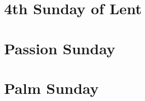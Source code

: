{{\bigskip
\benedicamusdomino{}
}

\def\commemorations{If today is March 18 or 19, the First Vespers of St Joseph is commemorated as on page \pageref{stjoseph-commem}.  If today is March 25 or 26, the First Vespers of the Annunciation is commemorated as on page \pageref{annunciation-commem}.}
{
\section{4th Sunday of Lent}
\printcommonvespers[1st]

\printcommemnote{}
}

{
\section{Passion Sunday}
\printcommonvespers[1st]

\printcommemnote{}
}

{
\section{Palm Sunday}
\printcommonvespers[1st]

\bigskip
\benedicamusdomino{}
}

}